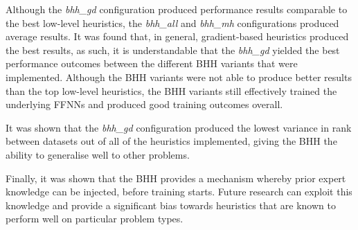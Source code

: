 Although the \textit{bhh\_gd} configuration produced performance results comparable to the best low-level heuristics, the \textit{bhh\_all} and \textit{bhh\_mh} configurations produced average results. It was found that, in general, gradient-based heuristics produced the best results, as such, it is understandable that the \textit{bhh\_gd} yielded the best performance outcomes between the different \acs{BHH} variants that were implemented. Although the \acs{BHH} variants were not able to produce better results than the top low-level heuristics, the \acs{BHH} variants still effectively trained the underlying \acp{FFNN} and produced good training outcomes overall.

It was shown that the \textit{bhh\_gd} configuration produced the lowest variance in rank between datasets out of all of the heuristics implemented, giving the \acs{BHH} the ability to generalise well to other problems.

Finally, it was shown that the \acs{BHH} provides a mechanism whereby prior expert knowledge can be injected, before training starts. Future research can exploit this knowledge and provide a significant bias towards heuristics that are known to perform well on particular problem types.

